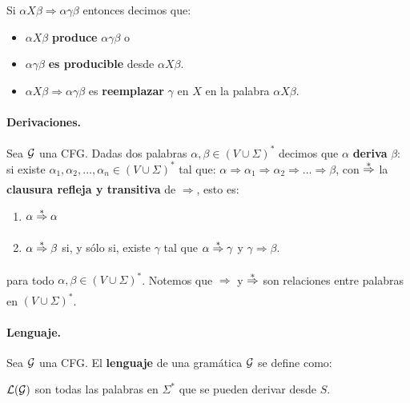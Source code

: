 Si $\alpha X \beta \Rightarrow \alpha \gamma \beta$ entonces decimos que:
\begin{itemize}
    \item $\alpha X \beta$ \textbf{produce} $\alpha \gamma \beta$ o
    \item $\alpha \gamma \beta$ \textbf{es producible} desde $\alpha X \beta$.
    \item $\alpha X \beta \Rightarrow \alpha \gamma \beta$ es \textbf{reemplazar} $\gamma$ en $X$ en la palabra $\alpha X \beta$.
\end{itemize}

\paragraph{Derivaciones.} Sea $\mathcal{G}$ una CFG. Dadas dos palabras $\alpha, \beta \in(V \cup \Sigma)^*$ decimos que $\alpha$ \textbf{deriva} $\beta$:
\alignformula{
    \alpha \overunder{\Rightarrow}{}{*} \beta
}
si existe $\alpha_1, \alpha_2, \ldots, \alpha_n \in(V \cup \Sigma)^*$ tal que: $\alpha \Rightarrow \alpha_1 \Rightarrow \alpha_2 \Rightarrow \ldots \Rightarrow \beta$, con $\underset{}{\overset{*}{\Rightarrow}}$ la \textbf{clausura refleja y transitiva} de $\Rightarrow$, esto es:
\begin{enumerate}
    \item $\alpha \underset{}{\overset{*}{\Rightarrow}} \alpha$
    \item $\alpha \underset{}{\overset{*}{\Rightarrow}} \beta$ si, y sólo si, existe $\gamma$ tal que $\alpha \underset{}{\overset{*}{\Rightarrow}} \gamma$ y $\gamma \Rightarrow \beta$.
\end{enumerate}
para todo $\alpha, \beta \in (V \cup \Sigma)^*$. Notemos que $\Rightarrow$ y $\underset{}{\overset{*}{\Rightarrow}}$ son relaciones entre palabras en $(V \cup \Sigma)^*$.

\paragraph{Lenguaje.} Sea $\mathcal{G}$ una CFG. El \textbf{lenguaje} de una gramática $\mathcal{G}$ se define como:

$\mathcal{L}(\mathcal{G})$ son todas las palabras en $\Sigma^*$ que se pueden derivar desde $S$.


